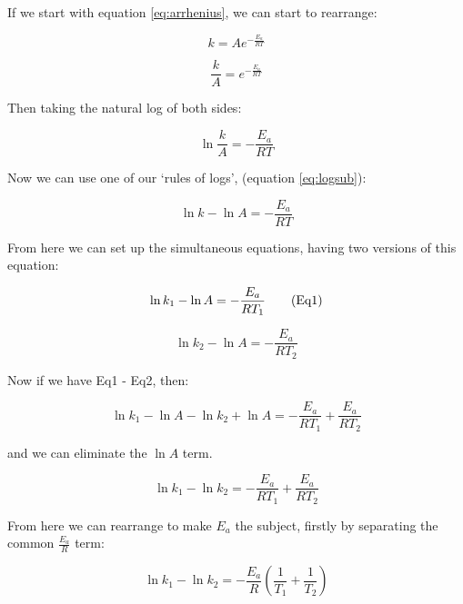 \documentclass[
]{book}
\begin{document}
If we start with equation \eqref{eq:arrhenius}, we can start to rearrange:

\begin{equation*}
k = A e^{-\frac{E_a}{RT}}
\end{equation*}

\begin{equation*}
\frac{k}{A}=e^{-\frac{E_a}{RT}}
\end{equation*}

Then taking the natural log of both sides:

\begin{equation*}
\ln \frac{k}{A}= -\frac{E_a}{RT}
\end{equation*}

Now we can use one of our `rules of logs', (equation \eqref{eq:logsub}):

\begin{equation*}
\ln {k} - \ln {A}= -\frac{E_a}{RT}
\end{equation*}

From here we can set up the simultaneous equations, having two versions of this equation:

\begin{equation*}
\ln {k_1} - \ln {A}= -\frac{E_a}{RT_1} \tag{Eq1} \\ 
\end{equation*}

\begin{equation*}
\ln {k_2} - \ln {A}= -\frac{E_a}{RT_2} \tag{Eq2}
\end{equation*}

Now if we have Eq1 - Eq2, then:

\begin{equation*}
\ln {k_1} - \ln {A} - \ln {k_2} + \ln {A}= -\frac{E_a}{RT_1} + \frac{E_a}{RT_2}
\end{equation*}

and we can eliminate the \(\ln A\) term.

\begin{equation*}
\ln {k_1} - \ln {k_2} = -\frac{E_a}{RT_1} + \frac{E_a}{RT_2}
\end{equation*}

From here we can rearrange to make \(E_a\) the subject, firstly by separating the common \(\frac{E_a}{R}\) term:

\begin{equation*}
\ln {k_1} - \ln {k_2} = -\frac{E_a}{R} \left(\frac{1}{T_1} + \frac{1}{T_2} \right)
\end{equation*}
\end{document}
